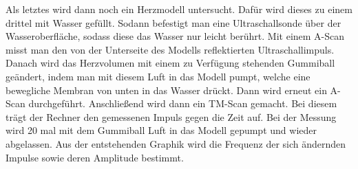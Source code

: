 Als letztes wird dann noch ein Herzmodell untersucht.
Dafür wird dieses zu einem drittel mit Wasser gefüllt. Sodann befestigt man eine Ultraschallsonde
über der Wasseroberfläche, sodass diese das Wasser nur leicht berührt. Mit einem A-Scan misst man den
von der Unterseite des Modells reflektierten Ultraschallimpuls. Danach wird das Herzvolumen mit einem
zu Verfügung stehenden Gummiball geändert, indem man mit diesem Luft in das Modell pumpt, welche eine bewegliche
Membran von unten in das Wasser drückt. Dann wird erneut ein A-Scan durchgeführt.
Anschließend wird dann ein TM-Scan gemacht. Bei diesem trägt der Rechner den gemessenen Impuls gegen die Zeit auf.
Bei der Messung wird 20 mal mit dem Gummiball Luft in das Modell gepumpt und wieder abgelassen. Aus der entstehenden
Graphik wird die Frequenz der sich ändernden Impulse sowie deren Amplitude bestimmt.
